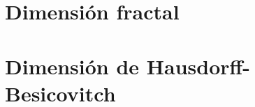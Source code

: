 \documentclass[a4paper, 11pt]{article} %
\begin{document}
\section{Dimensión fractal}
\section{Dimensión de Hausdorff-Besicovitch}
\end{document}
